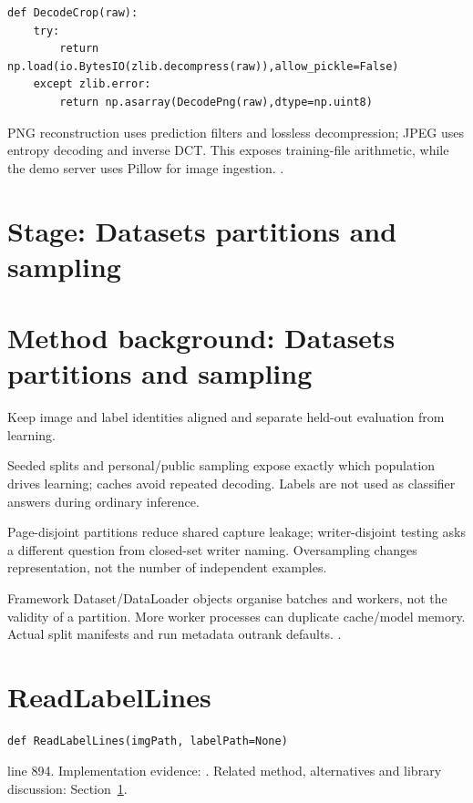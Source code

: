 \begin{lstlisting}[style=plain]
def DecodeCrop(raw):
    try:
        return np.load(io.BytesIO(zlib.decompress(raw)),allow_pickle=False)
    except zlib.error:
        return np.asarray(DecodePng(raw),dtype=np.uint8)
\end{lstlisting}
PNG reconstruction uses prediction filters and lossless decompression; JPEG uses entropy decoding and inverse DCT. This exposes training-file arithmetic, while the demo server uses Pillow for image ingestion. \cite{pngspec,jpegspec,pillowimage}.


\section*{Stage: Datasets partitions and sampling}
\section{Method background: Datasets partitions and sampling}\label{method:dataset}
Keep image and label identities aligned and separate held-out evaluation from learning.


Seeded splits and personal/public sampling expose exactly which population drives learning; caches avoid repeated decoding. Labels are not used as classifier answers during ordinary inference.


Page-disjoint partitions reduce shared capture leakage; writer-disjoint testing asks a different question from closed-set writer naming. Oversampling changes representation, not the number of independent examples.


Framework Dataset/DataLoader objects organise batches and workers, not the validity of a partition. More worker processes can duplicate cache/model memory. Actual split manifests and run metadata outrank defaults. \cite{marti2002,code2026,torchdata}.


\section{ReadLabelLines}\label{fn:train:ReadLabelLines}
\begin{lstlisting}[style=sig]
def ReadLabelLines(imgPath, labelPath=None)
\end{lstlisting}
 line 894. Implementation evidence: \cite{code2026}. Related method, alternatives and library discussion: Section~\ref{method:dataset}.



